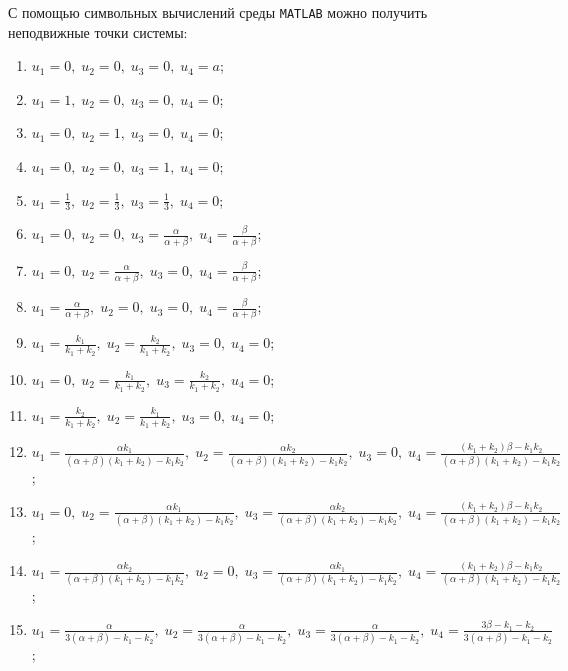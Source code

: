 \documentclass[12pt]{article}
\theoremstyle{rusdef}
\begin{document}
	С помощью символьных вычислений среды \texttt{MATLAB} можно получить неподвижные точки системы:
	\begin{enumerate}
	\item
	$u_1 = 0, \; u_2 = 0, \; u_3 = 0, \; u_4 = a$;
	\item
	$u_1 = 1, \; u_2 = 0, \; u_3 = 0, \; u_4 = 0$;
	\item
	$u_1 = 0, \; u_2 = 1, \; u_3 = 0, \; u_4 = 0$;
	\item
	$u_1 = 0, \; u_2 = 0, \; u_3 = 1, \; u_4 = 0$;
	\item
	$u_1 = \tfrac{1}{3}, \; u_2 = \tfrac{1}{3}, \; u_3 = \tfrac{1}{3}, \; u_4 = 0$;
	\item
	$u_1 = 0, \; u_2 = 0, \; u_3 = \tfrac{\alpha}{\alpha + \beta}, \; u_4 = \tfrac{\beta}{\alpha + \beta}$;
	\item
	$u_1 = 0, \; u_2 = \tfrac{\alpha}{\alpha + \beta}, \; u_3 = 0, \; u_4 = \tfrac{\beta}{\alpha + \beta}$;
	\item
	$u_1 = \tfrac{\alpha}{\alpha + \beta}, \; u_2 = 0, \; u_3 = 0, \; u_4 = \tfrac{\beta}{\alpha + \beta}$;
	\item
	$u_1 = \tfrac{k_1}{k_1 + k_2}, \; u_2 = \tfrac{k_2}{k_1 + k_2}, \; u_3 = 0, \; u_4 = 0$;
	\item
	$u_1 = 0, \; u_2 = \tfrac{k_1}{k_1 + k_2}, \; u_3 = \tfrac{k_2}{k_1 + k_2}, \; u_4 = 0$;
	\item
	$u_1 = \tfrac{k_2}{k_1 + k_2}, \; u_2 = \tfrac{k_1}{k_1 + k_2}, \; u_3 = 0, \; u_4 = 0$;
	\item
	$u_1 = \tfrac{\alpha k_1}{(\alpha + \beta)(k_1 + k_2) - k_1 k_2}, \; u_2 = \tfrac{\alpha k_2}{(\alpha + \beta)(k_1 + k_2) - k_1 k_2}, \; u_3 = 0, \; u_4 = \tfrac{(k_1 + k_2) \beta - k_1 k_2}{(\alpha + \beta)(k_1 + k_2) - k_1 k_2}$;
	\item
	$u_1 = 0, \; u_2 = \tfrac{\alpha k_1}{(\alpha + \beta)(k_1 + k_2) - k_1 k_2}, \; u_3 = \tfrac{\alpha k_2}{(\alpha + \beta)(k_1 + k_2) - k_1 k_2}, \; u_4 = \tfrac{(k_1 + k_2) \beta - k_1 k_2}{(\alpha + \beta)(k_1 + k_2) - k_1 k_2}$;
	\item
	$u_1 = \tfrac{\alpha k_2}{(\alpha + \beta)(k_1 + k_2) - k_1 k_2}, \; u_2 = 0, \; u_3 = \tfrac{\alpha k_1}{(\alpha + \beta)(k_1 + k_2) - k_1 k_2}, \; u_4 = \tfrac{(k_1 + k_2) \beta - k_1 k_2}{(\alpha + \beta)(k_1 + k_2) - k_1 k_2}$;
	\item
	$u_1 = \tfrac{\alpha}{3(\alpha + \beta) - k_1 - k_2}, \; u_2 = \tfrac{\alpha}{3(\alpha + \beta) - k_1 - k_2}, \; u_3 = \tfrac{\alpha}{3(\alpha + \beta) - k_1 - k_2}, \; u_4 = \tfrac{3\beta - k_1 - k_2}{3(\alpha + \beta) - k_1 - k_2}$;
	\end{enumerate}
	
\end{document}
